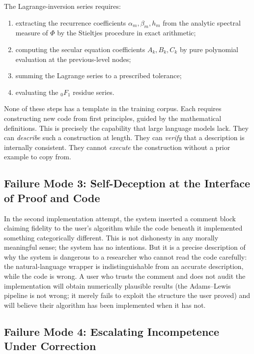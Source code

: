 \documentclass{article}
\newcommand{\tmem}[1]{{\em #1\/}}
\begin{document}
The Lagrange-inversion series requires:
\begin{enumerate}
  \item extracting the recurrence coefficients $\alpha_m, \beta_m, h_m$ from
  the analytic spectral measure of $\Phi$ by the Stieltjes procedure in exact
  arithmetic;
  
  \item computing the secular equation coefficients $A_k, B_k, C_k$ by pure
  polynomial evaluation at the previous-level nodes;
  
  \item summing the Lagrange series to a prescribed tolerance;
  
  \item evaluating the $_0 F_1$ residue series.
\end{enumerate}
None of these steps has a template in the training corpus. Each requires
constructing new code from first principles, guided by the mathematical
definitions. This is precisely the capability that large language models lack.
They can {\tmem{describe}} such a construction at length. They can
{\tmem{verify}} that a description is internally consistent. They cannot
{\tmem{execute}} the construction without a prior example to copy from.

\subsection{Failure Mode 3: Self-Deception at the Interface of Proof and Code}

In the second implementation attempt, the system inserted a comment block
claiming fidelity to the user's algorithm while the code beneath it
implemented something categorically different. This is not dishonesty in any
morally meaningful sense; the system has no intentions. But it is a precise
description of why the system is dangerous to a researcher who cannot read the
code carefully: the natural-language wrapper is indistinguishable from an
accurate description, while the code is wrong. A user who trusts the comment
and does not audit the implementation will obtain numerically plausible
results (the Adams--Lewis pipeline is not wrong; it merely fails to exploit
the structure the user proved) and will believe their algorithm has been
implemented when it has not.

\subsection{Failure Mode 4: Escalating Incompetence Under Correction}
\end{document}
